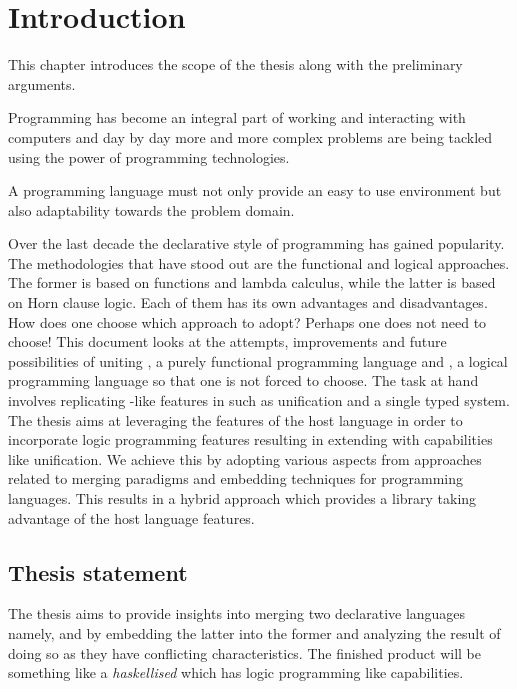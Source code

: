 \documentclass[thesis-solanki.tex]{subfiles}
\begin{document}
\chapter{Introduction}\label{chap:introduction}

This chapter introduces the scope of the thesis along with the preliminary arguments.

Programming has become an integral part of working and interacting with computers and day by day more and more
complex problems are being tackled using the power of programming technologies.

A programming language must not only provide an easy to use environment but also adaptability towards the problem
domain. 

Over the last decade the declarative style of programming has gained popularity.
The methodologies that have stood out are the functional and logical approaches.
The former is based on functions and lambda calculus, while the latter is based on Horn clause logic.
Each of them has its own advantages and disadvantages.
How does one choose which approach to adopt?
Perhaps one does not need to choose!
This document looks at the attempts, improvements and future possibilities of uniting , a purely
functional programming language and , a logical programming language so that one is not forced to
choose.
The task at hand involves replicating -like features in  such as unification and
a single typed system.
The thesis aims at leveraging the features of the host language in order to incorporate logic programming features
resulting in extending  with capabilities like unification.
We achieve this by adopting various aspects from approaches related to merging paradigms and embedding techniques
for programming languages.
This results in a hybrid approach which provides a library taking advantage of the host language features.




\section{Thesis statement}

The thesis aims to provide insights into merging two declarative languages namely,  and
 by embedding the latter into the former and analyzing the result of doing so as they have
conflicting characteristics.
The finished product will be something like a \textit{haskellised}  which has logic programming
like capabilities.
\end{document}
